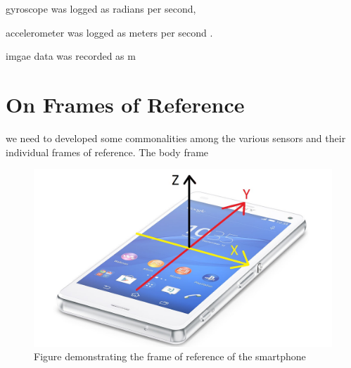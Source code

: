 gyroscope was logged as radians per second,

accelerometer was logged as meters per second .

imgae data was recorded as m

\section{On Frames of Reference}
we need to developed some commonalities among the various sensors and their individual frames of reference. The body frame

\begin{figure}[!ht] 
\captionsetup{width=0.5\linewidth, font=small}  
\includegraphics[width=0.5\linewidth]{figures/phone.jpg}
\caption{Figure demonstrating the frame of reference of the smartphone}
\label{fig:phone}
\end{figure}









